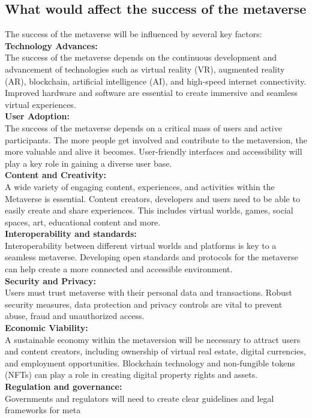 \subsection{What would affect the success of the metaverse}
The success of the metaverse will be influenced by several key factors:\\
\textbf{Technology Advances:}\\ The success of the metaverse depends on the continuous development and advancement of technologies such as virtual reality (VR), augmented reality (AR), blockchain, artificial intelligence (AI), and high-speed internet connectivity. Improved hardware and software are essential to create immersive and seamless virtual experiences.\\
\textbf{User Adoption:}\\ The success of the metaverse depends on a critical mass of users and active participants. The more people get involved and contribute to the metaversion, the more valuable and alive it becomes. User-friendly interfaces and accessibility will play a key role in gaining a diverse user base.\\
\textbf{Content and Creativity:}\\ A wide variety of engaging content, experiences, and activities within the Metaverse is essential. Content creators, developers and users need to be able to easily create and share experiences. This includes virtual worlds, games, social spaces, art, educational content and more.\\
\textbf{Interoperability and standards:}\\ Interoperability between different virtual worlds and platforms is key to a seamless metaverse. Developing open standards and protocols for the metaverse can help create a more connected and accessible environment.\\
\textbf{Security and Privacy:}\\ Users must trust metaverse with their personal data and transactions. Robust security measures, data protection and privacy controls are vital to prevent abuse, fraud and unauthorized access.\\
\textbf{Economic Viability:}\\ A sustainable economy within the metaversion will be necessary to attract users and content creators, including ownership of virtual real estate, digital currencies, and employment opportunities. Blockchain technology and non-fungible tokens (NFTs) can play a role in creating digital property rights and assets.\\
\textbf{Regulation and governance:}\\ Governments and regulators will need to create clear guidelines and legal frameworks for meta